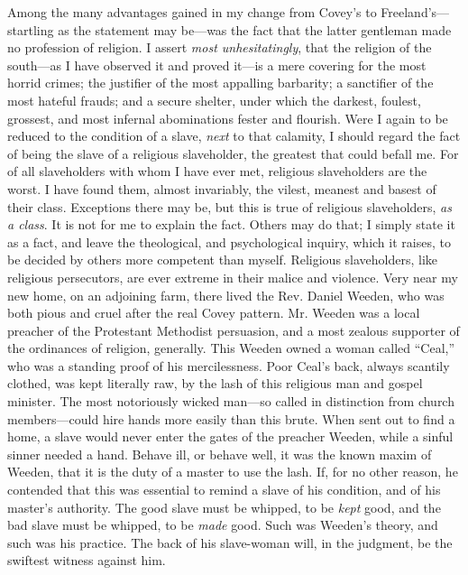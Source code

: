 Among the many advantages gained in my change from Covey's to
Freeland's---startling as the statement may be---was the fact that the
latter gentleman made no profession of religion. I assert \emph{most
unhesitatingly}, that the religion of the south---as I have observed it
and proved it---is a mere covering for the most horrid crimes; the
justifier of the most appalling barbarity; a sanctifier of the most
hateful frauds; and a secure shelter, under which the darkest, foulest,
grossest, and most infernal abominations fester and flourish. Were I
again to be reduced to the condition of a slave, \emph{next} to that
calamity, I should regard the fact of being the slave of a religious
slaveholder, the {\protect\hypertarget{258}{}{}}greatest that could
befall me. For of all slaveholders with whom I have ever met, religious
slaveholders are the worst. I have found them, almost invariably, the
vilest, meanest and basest of their class. Exceptions there may be, but
this is true of religious slaveholders, \emph{as a class}. It is not for
me to explain the fact. Others may do that; I simply state it as a fact,
and leave the theological, and psychological inquiry, which it raises,
to be decided by others more competent than myself. Religious
slaveholders, like religious persecutors, are ever extreme in their
malice and violence. Very near my new home, on an adjoining farm, there
lived the Rev. Daniel Weeden, who was both pious and cruel after the
real Covey pattern. Mr. Weeden was a local preacher of the Protestant
Methodist persuasion, and a most zealous supporter of the ordinances of
religion, generally. This Weeden owned a woman called ``Ceal,'' who was
a standing proof of his mercilessness. Poor Ceal's back, always scantily
clothed, was kept literally raw, by the lash of this religious man and
gospel minister. The most notoriously wicked man---so called in
distinction from church members---could hire hands more easily than this
brute. When sent out to find a home, a slave would never enter the gates
of the preacher Weeden, while a sinful sinner needed a hand. Behave ill,
or behave well, it was the known maxim of Weeden, that it is the duty of
a master to use the lash. If, for no other reason, he contended that
this was essential to remind a slave of his condition, and of his
master's authority. The good slave must be whipped, to be \emph{kept}
good, and the bad slave must be {\protect\hypertarget{259}{}{}}whipped,
to be \emph{made} good. Such was Weeden's theory, and such was his
practice. The back of his slave-woman will, in the judgment, be the
swiftest witness against him.

